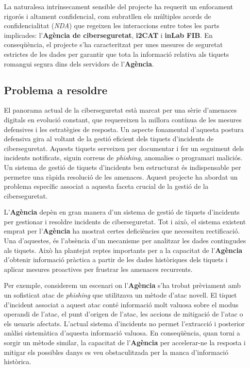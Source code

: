 La naturalesa intrínsecament sensible del projecte ha requerit un enfocament rigorós i altament confidencial, com subratllen els múltiples acords de confidencialitat (\textit{NDA}) que regeixen les interaccions entre totes les parts implicades: l'\textbf{Agència de ciberseguretat}, \textbf{i2CAT} i \textbf{inLab FIB}. En conseqüència, el projecte s'ha caracteritzat per unes mesures de seguretat estrictes de les dades per garantir que tota la informació relativa als tiquets romangui segura dins dels servidors de l'\textbf{Agència}.


\subsection{Problema a resoldre} \label{ssec:problema-resoldre}
El panorama actual de la ciberseguretat està marcat per una sèrie d'amenaces digitals en evolució constant, que requereixen la millora contínua de les mesures defensives i les estratègies de resposta. Un aspecte fonamental d'aquesta postura defensiva gira al voltant de la gestió eficient dels tiquets d'incidents de ciberseguretat. Aquests tiquets serveixen per documentar i fer un seguiment dels incidents notificats, siguin correus de \textit{phishing}, anomalies o programari maliciós. Un sistema de gestió de tiquets d'incidents ben estructurat és indispensable per permetre una ràpida resolució de les amenaces. Aquest projecte ha abordat un problema específic associat a aquesta faceta crucial de la gestió de la ciberseguretat.

L'\textbf{Agència} depèn en gran manera d'un sistema de gestió de tiquets d'incidents per gestionar i resoldre incidents de ciberseguretat. Tot i això, el sistema existent emprat per l'\textbf{Agència} ha mostrat certes deficiències que necessiten rectificació. Una d'aquestes, és l'absència d'un mecanisme per analitzar les dades contingudes als tiquets. Això ha plantejat reptes importants per a la capacitat de l'\textbf{Agència} d'obtenir informació pràctica a partir de les dades històriques dels tiquets i aplicar mesures proactives per frustrar les amenaces recurrents.

Per exemple, considerem un escenari on l'\textbf{Agència} s'ha trobat prèviament amb un sofisticat atac de \textit{phishing} que utilitzava un mètode d'atac novell. El tiquet d'incident associat a aquest atac conté informació molt valuosa sobre el modus operandi de l'atac, el punt d'origen de l'atac, les accions de mitigació de l'atac o els usuaris afectats. L'actual sistema d'incidents no permet l'extracció i posterior anàlisi sistemàtica d'aquesta informació valuosa. En conseqüència, quan torni a sorgir un mètode similar, la capacitat de l'\textbf{Agència} per accelerar-ne la resposta i mitigar els possibles danys es veu obstaculitzada per la manca d'informació històrica.

